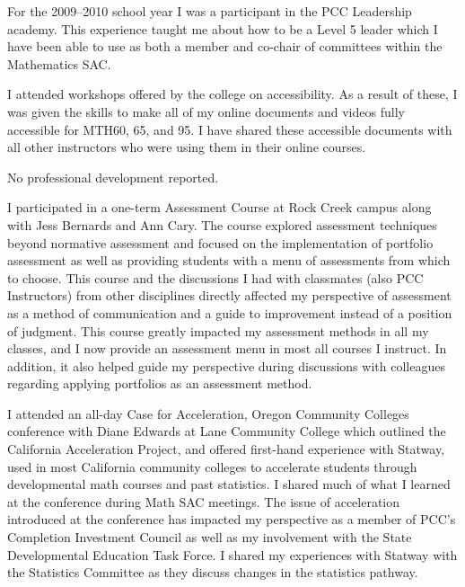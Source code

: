 \begin{description}[style=nextline]
	\item[Kimberly Neuburger (Full-time Instructor, Sylvania Campus)]
	For the 2009--2010 school year I was a participant in the PCC Leadership
	academy. This experience taught me about how to be a Level 5 leader which I
	have been able to use as both a member and co-chair of committees within the
	Mathematics SAC.

	I attended workshops offered by the college on accessibility. As a result of
	these, I was given the skills to make all of my online documents and videos
	fully accessible for MTH60, 65, and 95. I have shared these accessible
	documents with all other instructors who were using them in their online
	courses.

	\item[Scott Perry (Full-time Instructor, Sylvania Campus)]
	No professional development reported.

	\item[Jeff Pettit (Full-time Instructor, Rock Creek Campus)]
	I participated in a one-term Assessment Course at Rock Creek campus along with
	Jess Bernards and Ann Cary. The course explored assessment techniques beyond
	normative assessment and focused on the implementation of portfolio assessment
	as well as providing students with a menu of assessments from which to choose.
	This course and the discussions I had with classmates (also PCC Instructors)
	from other disciplines directly affected my perspective of assessment as a
	method of communication and a guide to improvement instead of a position of
	judgment. This course greatly impacted my assessment methods in all my classes,
	and I now provide an assessment menu in most all courses I instruct. In
	addition, it also helped guide my perspective during discussions with
	colleagues regarding applying portfolios as an assessment method.

	I attended an all-day Case for Acceleration, Oregon Community Colleges
	conference with Diane Edwards at Lane Community College which outlined the
	California Acceleration Project, and offered first-hand experience with
	Statway, used in most California community colleges to accelerate students
	through developmental math courses and past statistics. I shared much of what I
	learned at the conference during Math SAC meetings. The issue of acceleration
	introduced at the conference has impacted my perspective as a member of
	PCC's Completion Investment Council as well as my involvement with the State
	Developmental Education Task Force. I shared my experiences with Statway with
	the Statistics Committee as they discuss changes in the statistics pathway.


\end{description}
